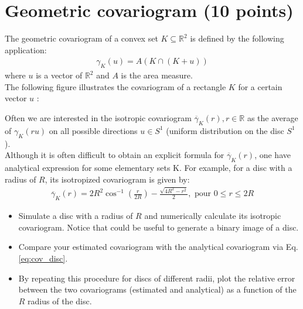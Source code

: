\section{Geometric covariogram (10 points)}
The geometric covariogram of a convex set $K\subseteq \mathbb{R}^2$ is defined by the following application:
\begin{eqnarray}
\gamma_K(u)=A(K\cap (K+u))
\end{eqnarray} 
where $u$ is a vector of $\mathbb{R}^2$ and $A$ is the area measure.\\
The following figure illustrates the covariogram of a rectangle $K$ for a certain vector $u$ :
\begin{figure}[h]
\centering
{}
\end{figure}

\noindent Often we are interested in the isotropic covariogram $\overline{\gamma}_K(r), r\in \mathbb{R}$ as the average of $\gamma_K(ru)$ on all possible directions $u\in S^1$ (uniform distribution on the disc $S^1$).\\
Although it is often difficult to obtain an explicit formula for $\overline{\gamma}_K(r)$, one have analytical expression for some elementary sets K. For example, for a disc with a radius of $R$, its isotropized covariogram is given by:
\begin{eqnarray}
\overline{\gamma}_K(r)=2R^2\cos^{-1}\left(\frac{r}{2R}\right)-\frac{\sqrt{4R^2-r^2}}{2}, \textrm{ pour } 0\leq r \leq 2R \label{eq:cov_disc}
\end{eqnarray}

\begin{qbox}
\begin{itemize}
\item Simulate a disc with a radius of $R$ and numerically calculate its isotropic covariogram. Notice that  could be useful to generate a binary image of a disc.
\item Compare your estimated covariogram with the analytical covariogram via Eq.\ref{eq:cov_disc}.
\item By repeating this procedure for discs of different radii, plot the relative error between the two covariograms (estimated and analytical) as a function of the $R$ radius of the disc.
\end{itemize}
\end{qbox}

